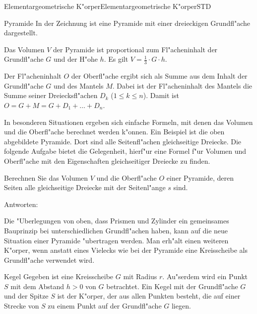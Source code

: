 \begin{MXContent}{Elementargeometrische K"orper}{Elementargeometrische K"orper}{STD}
\begin{MXInfo}{Pyramide}
In der Zeichnung ist eine Pyramide mit einer dreieckigen Grundfl"ache 
dargestellt.

Das Volumen $V$ der Pyramide ist proportional zum Fl"acheninhalt der 
Grundfl"ache $G$ und der H"ohe $h$. 
Es gilt $V = \frac{1}{3} \cdot G \cdot h$.

Der Fl"acheninhalt $O$ der Oberfl"ache ergibt sich als Summe aus dem Inhalt 
der Grundfl"ache $G$ und des Mantels $M$. Dabei ist der Fl"acheninhalt des 
Mantels die Summe seiner Dreiecksfl"achen $D_k$ ($1 \leq k \leq n$).
Damit ist $O = G + M = G + D_1 + \ldots + D_n$.
\end{MXInfo}

In besonderen Situationen ergeben sich einfache Formeln, mit denen 
das Volumen und die Oberfl"ache berechnet werden k"onnen. Ein Beispiel ist
die oben abgebildete Pyramide. Dort sind alle Seitenfl"achen gleichseitige 
Dreiecke. Die folgende Aufgabe bietet die Gelegenheit, hierf"ur eine Formel
f"ur Volumen und Oberfl"ache mit den Eigenschaften gleichseitiger Dreiecke
zu finden.

\begin{MExercise}
Berechnen Sie das Volumen $V$ und die Oberfl"ache $O$ einer Pyramide, deren 
Seiten alle gleichseitige Dreiecke mit der Seitenl"ange $s$ sind.

Antworten:
\begin{MExerciseItems}
\item {}
\item {}
\end{MExerciseItems}
\end{MExercise}


Die "Uberlegungen von oben, dass Prismen und Zylinder ein gemeinsames 
Bauprinzip bei unterschiedlichen Grundfl"achen haben, kann auf die neue 
Situation einer Pyramide "ubertragen werden.
Man erh"alt einen weiteren K"orper, wenn anstatt eines Vielecks wie bei der 
Pyramide eine Kreisscheibe als Grundfl"ache verwendet wird.

\begin{MXInfo}{Kegel}
Gegeben ist eine Kreisscheibe $G$ mit Radius $r$.
Au"serdem wird ein Punkt $S$ mit dem Abstand $h > 0$ von $G$ betrachtet.
Ein Kegel mit der Grundfl"ache $G$ und der Spitze $S$ ist der K"orper,
der aus allen Punkten besteht, die auf einer Strecke von $S$ zu einem 
Punkt auf der Grundfl"ache $G$ liegen.


\end{MXInfo}
\end{MXContent}
